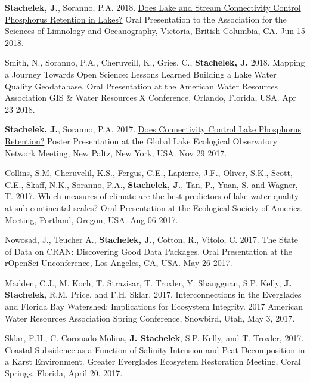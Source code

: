 \documentclass[11pt]{article}
\makeatletter
\newlength{\bibhang}
\newlength{\bibsep}
 {\@listi \global\bibsep\itemsep \global\advance\bibsep by\parsep}
\newenvironment{bibenum*}
  {\renewcommand\labelenumi{[\theenumi]}%
   \etaremune[
     topsep=0pt,
     itemsep=\bibsep,
     parsep=0pt,partopsep=0pt,
     itemindent=-\bibhang,
     leftmargin={\bibhang+\widthof{[999]}}]}
  {\endetaremune}
\makeatother
\begin{document}
\begin{bibenum*}
  \item \textbf{Stachelek, J.}, Soranno, P.A. 2018. \href{https://doi.org/10.6084/m9.figshare.5903875.v2}{Does Lake and Stream Connectivity Control Phosphorus Retention in Lakes?} Oral Presentation to the Association for the Sciences of Limnology and Oceanography, Victoria, British Columbia, CA. Jun 15 2018.

  \item Smith, N., Soranno, P.A., Cheruveill, K., Gries, C., \textbf{Stachelek, J.} 2018. Mapping a Journey Towards Open Science: Lessons Learned Building a Lake Water Quality Geodatabase. Oral Presentation at the American Water Resources Association GIS \& Water Resources X Conference, Orlando, Florida, USA. Apr 23 2018.

  \item \textbf{Stachelek, J.}, Soranno, P.A. 2017. \href{https://doi.org/10.6084/m9.figshare.9638735.v1}{Does Connectivity Control Lake Phosphorus Retention?} Poster Presentation at the Global Lake Ecological Observatory Network Meeting, New Paltz, New York, USA. Nov 29 2017.

  \item Collins, S.M, Cheruvelil, K.S., Fergus, C.E., Lapierre, J.F., Oliver, S.K., Scott, C.E., Skaff, N.K., Soranno, P.A., \textbf{Stachelek, J.}, Tan, P., Yuan, S. and Wagner, T. 2017. Which measures of climate are the best predictors of lake water quality at sub-continental scales? Oral Presentation at the Ecological Society of America Meeting, Portland, Oregon, USA. Aug 06 2017.

  \item Nowosad, J., Teucher A., \textbf{Stachelek, J.}, Cotton, R., Vitolo, C. 2017. The State of Data on CRAN: Discovering Good Data Packages. Oral Presentation at the rOpenSci Unconference, Los Angeles, CA, USA. May 26 2017.

  \item Madden, C.J., M. Koch, T. Strazisar, T. Troxler, Y. Shangguan, S.P. Kelly, \textbf{J. Stachelek}, R.M. Price, and F.H. Sklar, 2017. Interconnections in the Everglades and Florida Bay Watershed: Implications for Ecosystem Integrity. 2017 American Water Resources Association Spring Conference, Snowbird, Utah, May 3, 2017.

  \item Sklar, F.H., C. Coronado-Molina, \textbf{J. Stachelek}, S.P. Kelly, and T. Troxler, 2017. Coastal Subsidence as a Function of Salinity Intrusion and Peat Decomposition in a Karst Environment. Greater Everglades Ecosystem Restoration Meeting, Coral Springs, Florida, April 20, 2017.


\end{bibenum*}
\end{document}
